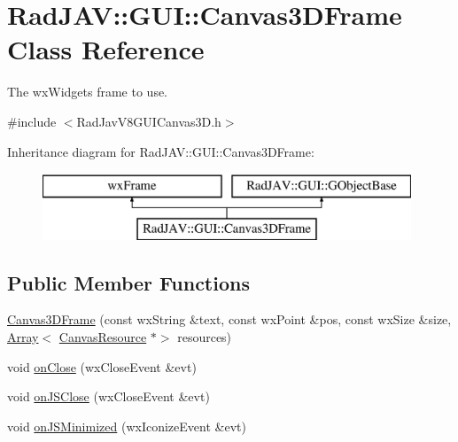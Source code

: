 \hypertarget{class_rad_j_a_v_1_1_g_u_i_1_1_canvas3_d_frame}{}\section{Rad\+J\+AV\+:\+:G\+UI\+:\+:Canvas3\+D\+Frame Class Reference}
\label{class_rad_j_a_v_1_1_g_u_i_1_1_canvas3_d_frame}


The wx\+Widgets frame to use.  




{\ttfamily \#include $<$Rad\+Jav\+V8\+G\+U\+I\+Canvas3\+D.\+h$>$}

Inheritance diagram for Rad\+J\+AV\+:\+:G\+UI\+:\+:Canvas3\+D\+Frame\+:\begin{figure}[H]
\begin{center}
\leavevmode
\includegraphics[height=2.000000cm]{class_rad_j_a_v_1_1_g_u_i_1_1_canvas3_d_frame}
\end{center}
\end{figure}
\subsection*{Public Member Functions}
\begin{DoxyCompactItemize}
\item 
\mbox{\hyperlink{class_rad_j_a_v_1_1_g_u_i_1_1_canvas3_d_frame_a1eaab2549313e864358c748f0c0b8669}{Canvas3\+D\+Frame}} (const wx\+String \&text, const wx\+Point \&pos, const wx\+Size \&size, \mbox{\hyperlink{class_rad_j_a_v_1_1_array}{Array}}$<$ \mbox{\hyperlink{class_rad_j_a_v_1_1_g_u_i_1_1_canvas_resource}{Canvas\+Resource}} $\ast$$>$ resources)
\item 
void \mbox{\hyperlink{class_rad_j_a_v_1_1_g_u_i_1_1_canvas3_d_frame_a52399cb8930d901820e147bce64cb00d}{on\+Close}} (wx\+Close\+Event \&evt)
\item 
void \mbox{\hyperlink{class_rad_j_a_v_1_1_g_u_i_1_1_canvas3_d_frame_a9f9100516ed69102f4401567075c394a}{on\+J\+S\+Close}} (wx\+Close\+Event \&evt)
\item 
void \mbox{\hyperlink{class_rad_j_a_v_1_1_g_u_i_1_1_canvas3_d_frame_aa6cfb315cc524b2a565dd6bef26876ba}{on\+J\+S\+Minimized}} (wx\+Iconize\+Event \&evt)
\end{DoxyCompactItemize}
